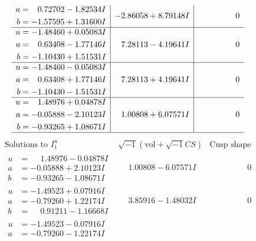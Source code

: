 \documentclass[1p]{elsarticle_modified}
\theoremstyle{definition}
\newcommand{\I}{\sqrt{-1}}
\begin{document}
$$\begin{array}{c|c|c}
\begin{aligned}
a &= \phantom{-}0.72702 - 1.82534 I \\
b &= -1.57595 + 1.31600 I\end{aligned}
 & -2.86058 + 8.79148 I & \phantom{-0.000000 } 0 \\ \hline\begin{aligned}
u &= -1.48460 + 0.05083 I \\
a &= \phantom{-}0.63408 - 1.77146 I \\
b &= -1.10430 + 1.51531 I\end{aligned}
 & \phantom{-}7.28113 - 4.19641 I & \phantom{-0.000000 } 0 \\ \hline\begin{aligned}
u &= -1.48460 - 0.05083 I \\
a &= \phantom{-}0.63408 + 1.77146 I \\
b &= -1.10430 - 1.51531 I\end{aligned}
 & \phantom{-}7.28113 + 4.19641 I & \phantom{-0.000000 } 0 \\ \hline\begin{aligned}
u &= \phantom{-}1.48976 + 0.04878 I \\
a &= -0.05888 - 2.10123 I \\
b &= -0.93265 + 1.08671 I\end{aligned}
 & \phantom{-}1.00808 + 6.07571 I & \phantom{-0.000000 } 0\\
 \hline 
 \end{array}$$\newpage$$\begin{array}{c|c|c}  
\text{Solutions to }I^u_{1}& \I (\text{vol} + \sqrt{-1}CS) & \text{Cusp shape}\\
 \hline 
\begin{aligned}
u &= \phantom{-}1.48976 - 0.04878 I \\
a &= -0.05888 + 2.10123 I \\
b &= -0.93265 - 1.08671 I\end{aligned}
 & \phantom{-}1.00808 - 6.07571 I & \phantom{-0.000000 } 0 \\ \hline\begin{aligned}
u &= -1.49523 + 0.07916 I \\
a &= -0.79260 + 1.22174 I \\
b &= \phantom{-}0.91211 - 1.16668 I\end{aligned}
 & \phantom{-}3.85916 - 1.48032 I & \phantom{-0.000000 } 0 \\ \hline\begin{aligned}
u &= -1.49523 - 0.07916 I \\
a &= -0.79260 - 1.22174 I \\

\end{aligned}
\end{array}$$
\end{document}
